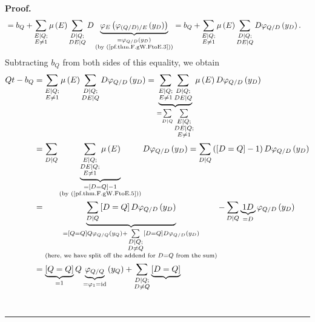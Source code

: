 \documentclass[numbers=enddot,12pt,final,onecolumn,notitlepage]{scrartcl}%
\theoremstyle{definition}
\newenvironment{proof}[1][Proof]{\noindent\textbf{#1.} }{\ \rule{0.5em}{0.5em}}
\let\sumnonlimits\sum
\renewcommand{\sum}{\sumnonlimits\limits}
\begin{document}
\begin{proof}
\begin{align*}
&  =b_{Q}+\sum_{\substack{E\mid Q;\\E\neq1}}\mu\left(  E\right)
\sum_{\substack{D\mid Q;\\DE\mid Q}}D\underbrace{\varphi_{E}\left(
\varphi_{\left(  Q/D\right)  /E}\left(  y_{D}\right)  \right)  }%
_{\substack{=\varphi_{Q/D}\left(  y_{D}\right)  \\\text{(by
(\ref{pf.thm.F.gW.FtoE.3}))}}}=b_{Q}+\sum_{\substack{E\mid Q;\\E\neq1}%
}\mu\left(  E\right)  \sum_{\substack{D\mid Q;\\DE\mid Q}}D\varphi
_{Q/D}\left(  y_{D}\right)  .
\end{align*}
Subtracting $b_{Q}$ from both sides of this equality, we obtain%
\begin{align*}
Qt-b_{Q}  &  =\sum_{\substack{E\mid Q;\\E\neq1}}\mu\left(  E\right)
\sum_{\substack{D\mid Q;\\DE\mid Q}}D\varphi_{Q/D}\left(  y_{D}\right)
=\underbrace{\sum_{\substack{E\mid Q;\\E\neq1}}\sum_{\substack{D\mid
Q;\\DE\mid Q}}}_{=\sum_{D\mid Q}\sum_{\substack{E\mid Q;\\DE\mid Q;\\E\neq1}%
}}\mu\left(  E\right)  D\varphi_{Q/D}\left(  y_{D}\right) \\
&  =\sum_{D\mid Q}\underbrace{\sum_{\substack{E\mid Q;\\DE\mid Q;\\E\neq1}%
}\mu\left(  E\right)  }_{\substack{=\left[  D=Q\right]  -1\\\text{(by
(\ref{pf.thm.F.gW.FtoE.5}))}}}D\varphi_{Q/D}\left(  y_{D}\right)  =\sum_{D\mid
Q}\left(  \left[  D=Q\right]  -1\right)  D\varphi_{Q/D}\left(  y_{D}\right) \\
&  =\underbrace{\sum_{D\mid Q}\left[  D=Q\right]  D\varphi_{Q/D}\left(
y_{D}\right)  }_{\substack{=\left[  Q=Q\right]  Q\varphi_{Q/Q}\left(
y_{Q}\right)  +\sum_{\substack{D\mid Q;\\D\neq Q}}\left[  D=Q\right]
D\varphi_{Q/D}\left(  y_{D}\right)  \\\text{(here, we have split off the
addend for }D=Q\text{ from the sum)}}}-\sum_{D\mid Q}\underbrace{1D}%
_{=D}\varphi_{Q/D}\left(  y_{D}\right) \\
&  =\underbrace{\left[  Q=Q\right]  }_{=1}Q\underbrace{\varphi_{Q/Q}%
}_{=\varphi_{1}=\operatorname*{id}}\left(  y_{Q}\right)  +\sum
_{\substack{D\mid Q;\\D\neq Q}}\underbrace{\left[  D=Q\right]  }%

\end{align*}
\end{proof}
\end{document}
